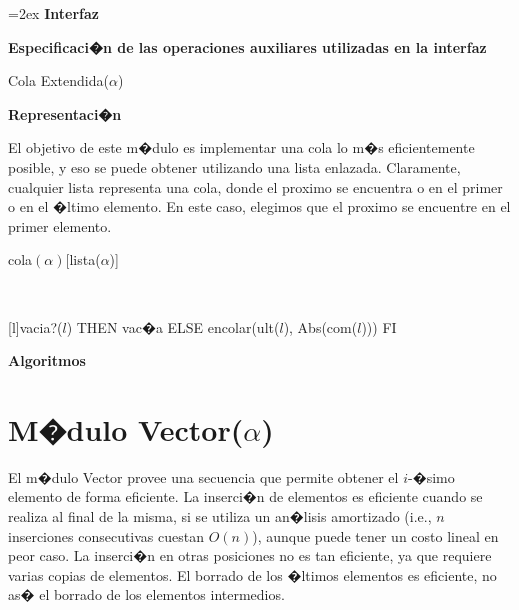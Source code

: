 \documentclass[a4paper,10pt]{article}
\newenvironment{Interfaz}{%
  \parskip=2ex%
  \noindent\textbf{\Large Interfaz}%
  \par%
}{}
\newenvironment{Representacion}{%
  \vspace*{2ex}%
  \noindent\textbf{\Large Representaci�n}%
  \vspace*{2ex}%
}{}
\newenvironment{Algoritmos}{%
  \vspace*{2ex}%
  \noindent\textbf{\Large Algoritmos}%
  \vspace*{2ex}%
}{}
\newcommand{\Titulo}[1]{
  \vspace*{1ex}\par\noindent\textbf{\large #1}\par
}
\begin{document}
\begin{Interfaz}
  \Titulo{Especificaci�n de las operaciones auxiliares utilizadas en la interfaz}

  \begin{tad}{Cola Extendida($\alpha$)}
    \parskip=0pt
    
    \tadAxiomas
  \end{tad}

\end{Interfaz}

\begin{Representacion}
  
  El objetivo de este m�dulo es implementar una cola lo m�s eficientemente posible, y eso se puede obtener utilizando una lista enlazada.  Claramente, cualquier lista representa una cola, donde el proximo se encuentra o en el primer o en el �ltimo elemento.  En este caso, elegimos que el proximo se encuentre en el primer elemento.

  \begin{Estructura}{cola$(\alpha)$}[lista($\alpha$)]
  \end{Estructura}


  ~

  [l]{\IF vacia?($l$) THEN vac�a ELSE encolar(ult($l$), Abs(com($l$))) FI}

\end{Representacion}

\begin{Algoritmos}
  
\end{Algoritmos}


\section{M�dulo Vector($\alpha$)}

El m�dulo Vector provee una secuencia que permite obtener el $i$-�simo elemento de forma eficiente.  La inserci�n de elementos es eficiente cuando se realiza al final de la misma, si se utiliza un an�lisis amortizado (i.e., $n$ inserciones consecutivas cuestan $O(n)$), aunque puede tener un costo lineal en peor caso.  La inserci�n en otras posiciones no es tan eficiente, ya que requiere varias copias de elementos.  El borrado de los �ltimos elementos es eficiente, no as� el borrado de los elementos intermedios.  
\end{document}
